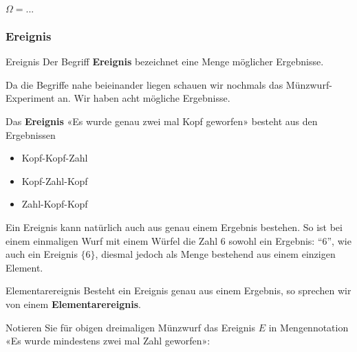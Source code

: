 $\Omega=...$




\subsubsection{Ereignis}
\begin{definition}{Ereignis}{}
Der Begriff \textbf{Ereignis} bezeichnet eine Menge möglicher
Ergebnisse.
\end{definition}

Da die Begriffe nahe beieinander liegen schauen wir
nochmals das Münzwurf-Experiment an. Wir haben acht mögliche
Ergebnisse. 

Das \textbf{Ereignis} «Es wurde genau zwei mal Kopf geworfen» besteht
aus den Ergebnissen

\begin{itemize}
\item Kopf-Kopf-Zahl
\item Kopf-Zahl-Kopf
\item Zahl-Kopf-Kopf
\end{itemize}

\begin{bemerkung}{}{}
  Ein Ereignis kann natürlich auch aus genau einem Ergebnis bestehen. So ist bei einem einmaligen Wurf mit einem Würfel die Zahl 6 sowohl ein Ergebnis: ``6'', wie auch ein Ereignis $\{6\}$, diesmal jedoch als Menge bestehend aus einem einzigen Element. 
  \end{bemerkung}

\begin{definition}{Elementarereignis}{}
Besteht ein Ereignis genau aus einem Ergebnis, so sprechen wir von einem \textbf{Elementarereignis}.
\end{definition}

Notieren Sie für obigen dreimaligen Münzwurf das Ereignis $E$ in Mengennotation «Es wurde mindestens
zwei mal Zahl geworfen»:

